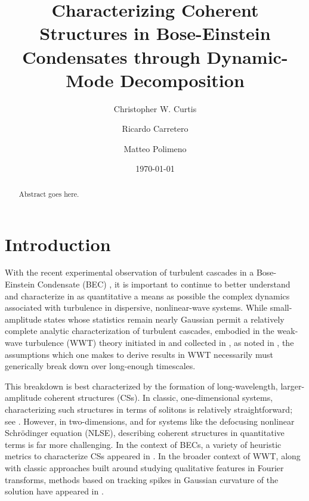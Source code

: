 \documentclass[aps,prl,preprint,groupedaddress]{revtex4-1}
\begin{document}
\author{Christopher W. Curtis}
\author{Ricardo Carretero}
\author{Matteo Polimeno}
\date{\today}
\title{Characterizing Coherent Structures in Bose-Einstein Condensates through Dynamic-Mode Decomposition}

\begin{abstract}
Abstract goes here.
\end{abstract}
\maketitle
\section*{Introduction}
With the recent experimental observation of turbulent cascades in a Bose-Einstein Condensate (BEC) \cite{navon}, it is important to continue to better understand and characterize in as quantitative a means as possible the complex dynamics associated with turbulence in dispersive, nonlinear-wave systems.  While small-amplitude states whose statistics remain nearly Gaussian permit a relatively complete analytic characterization of turbulent cascades, embodied in the weak-wave turbulence (WWT) theory initiated in \cite{zakharov} and collected in \cite{nazarenko}, as noted in \cite{newell,cai}, the assumptions which one makes to derive results in WWT necessarily must generically break down over long-enough timescales.  

This breakdown is best characterized by the formation of long-wavelength, larger-amplitude coherent structures (CSs).  In classic, one-dimensional systems, characterizing such structures in terms of solitons is relatively straightforward; see \cite{cai}.  However, in two-dimensions, and for systems like the defocusing nonlinear Schr\"{o}dinger equation (NLSE), describing coherent structures in quantitative terms is far more challenging.  In the context of BECs, a variety of heuristic metrics to characterize CSs appeared in \cite{nazarenko2}.  In the broader context of WWT, along with classic approaches built around studying qualitative features in Fourier transforms, methods based on tracking spikes in Gaussian curvature of the solution have appeared in \cite{mordant}.  
\end{document}
